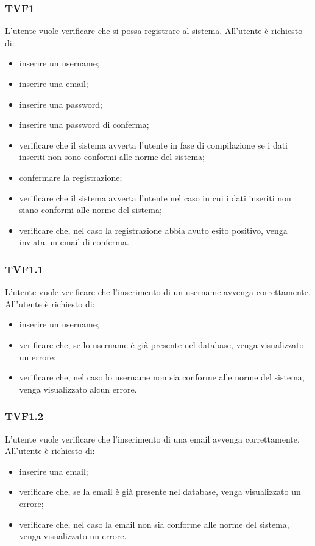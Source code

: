 		\subsubsection{TVF1}
			L'utente vuole verificare che si possa registrare al sistema. All'utente è richiesto di:
			\begin{itemize}
				\item inserire un username;
				\item inserire una email;
				\item inserire una password;
				\item inserire una password di conferma;
				\item verificare che il sistema avverta l'utente in fase di compilazione se i dati inseriti non sono conformi alle norme del sistema;
				\item confermare la registrazione;
				\item verificare che il sistema avverta l'utente nel caso in cui i dati inseriti non siano conformi alle norme del sistema;
				\item verificare che, nel caso la registrazione abbia avuto esito positivo, venga inviata un email di conferma.
			\end{itemize}
			
		\subsubsection{TVF1.1}
			L'utente vuole verificare che l'inserimento di un username avvenga correttamente. All'utente è richiesto di:
			\begin{itemize}
				\item inserire un username;
				\item verificare che, se lo username è già presente nel database, venga visualizzato un errore;
				\item verificare che, nel caso lo username non sia conforme alle norme del sistema, venga visualizzato alcun errore.
			\end{itemize}
			
		\subsubsection{TVF1.2}
			L'utente vuole verificare che l'inserimento di una email avvenga correttamente. All'utente è richiesto di:
			\begin{itemize}
				\item inserire una email;
				\item verificare che, se la email è già presente nel database, venga visualizzato un errore;
				\item verificare che, nel caso la email non sia conforme alle norme del sistema, venga visualizzato un errore.
			\end{itemize}
			
